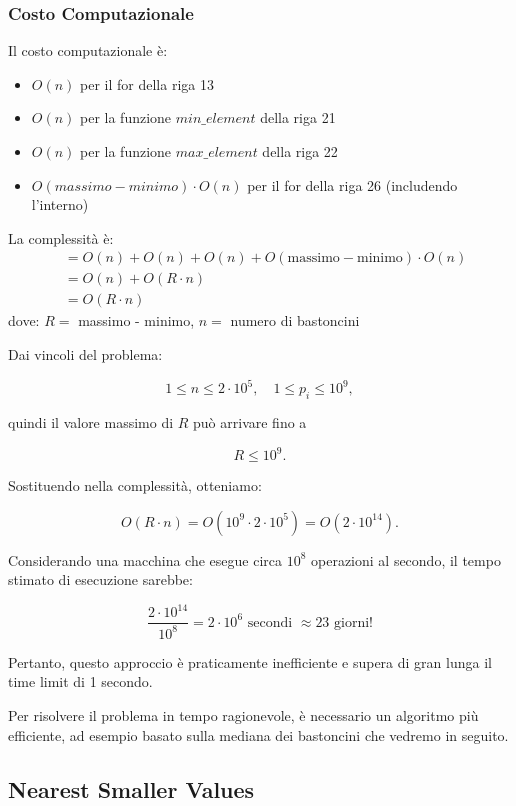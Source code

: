 \subsubsection*{Costo Computazionale}
	Il costo computazionale è:
	\begin{itemize}
		\item $O(n)$ per il for della riga 13
		\item $O(n)$ per la funzione $min\_element$ della riga 21
		\item $O(n)$ per la funzione $max\_element$ della riga 22
		\item $O(massimo - minimo) \cdot O(n) $ per il for della riga 26 (includendo l'interno)
	\end{itemize}
	
	La complessità è: 
\begin{align*}
	&= O(n) + O(n) + O(n) + O(\text{massimo} - \text{minimo}) \cdot O(n) \\
	&= O(n) + O(R \cdot n) \\
	&= O(R \cdot n)
\end{align*}
	dove: $R =$ massimo - minimo, $n = $ numero di bastoncini
	

	Dai vincoli del problema:
	
	\[
	1 \le n \le 2 \cdot 10^5, \quad 1 \le p_i \le 10^9,
	\]
	
	quindi il valore massimo di \(R\) può arrivare fino a
	
	\[
	R \le 10^9.
	\]
	
	Sostituendo nella complessità, otteniamo:
	
	\[
	O(R \cdot n) = O(10^9 \cdot 2 \cdot 10^5) = O(2 \cdot 10^{14}).
	\]
	
	Considerando una macchina che esegue circa \(10^8\) operazioni al secondo, il tempo stimato di esecuzione sarebbe:
	
	\[
	\frac{2 \cdot 10^{14}}{10^8} = 2 \cdot 10^6 \text{ secondi } \approx 23 \text{ giorni!}
	\]
	
	\noindent
	Pertanto, questo approccio è praticamente inefficiente e supera di gran lunga il time limit di 1 secondo. 
	
	Per risolvere il problema in tempo ragionevole, è 
	necessario un algoritmo più efficiente, ad esempio basato sulla mediana dei bastoncini che vedremo in seguito.
	
	
	
	

	\newpage
	
	
	\subsection{Nearest Smaller Values}
	\label{problema:brute-force:Nearest-Smaller-Values}
	
